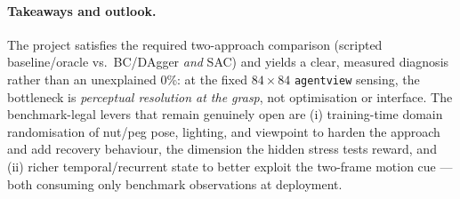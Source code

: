 \documentclass[10pt]{article}
\newcommand{\code}[1]{\texttt{\small #1}}
\begin{document}
\paragraph{Takeaways and outlook.} The project satisfies the required
two-approach comparison (scripted baseline/oracle vs.\ BC/DAgger \emph{and} SAC) and
yields a clear, measured diagnosis rather than an unexplained 0\%: at the fixed
$84{\times}84$ \code{agentview} sensing, the bottleneck is \emph{perceptual
resolution at the grasp}, not optimisation or interface. The benchmark-legal levers
that remain genuinely open are (i) training-time domain randomisation of nut/peg
pose, lighting, and viewpoint to harden the approach and add recovery behaviour,
the dimension the hidden stress tests reward, and (ii) richer temporal/recurrent
state to better exploit the two-frame motion cue --- both consuming only benchmark
observations at deployment.
\end{document}
